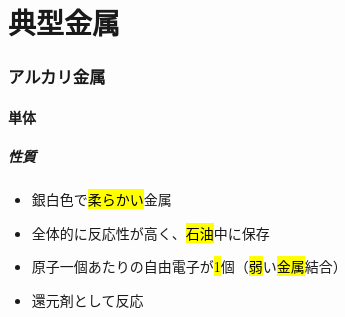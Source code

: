 \part{典型金属}
\section{アルカリ金属}
\subsection{単体}
\subsubsection{性質}
\begin{itemize}
  \item 銀白色で\hl{柔らかい}金属
  \item 全体的に反応性が高く、\hl{石油}中に保存
  \item 原子一個あたりの自由電子が\hl{1}個（\hl{弱}い\hl{金属}結合）
  \item 還元剤として反応\\
\end{itemize}
